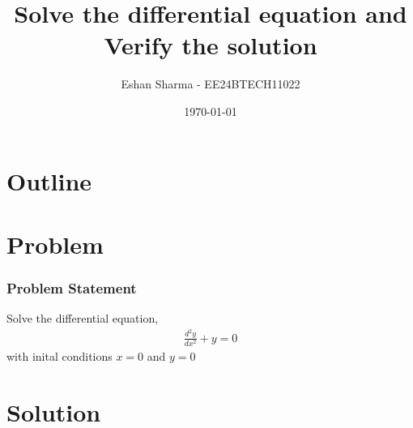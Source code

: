 \documentclass{beamer}
\title{Solve the differential equation and Verify the solution}
\author{Eshan Sharma - EE24BTECH11022}
\date{\today}
\theoremstyle{remark}
\numberwithin{equation}{section}
\begin{document}
	
	\begin{frame}
		\titlepage
	\end{frame}
	
	\section*{Outline}
	\begin{frame}
		\tableofcontents
	\end{frame}
	
	\section{Problem}
	\begin{frame}
		\frametitle{Problem Statement}
		Solve the differential equation,
		\begin{align}
			\frac{d^2y}{dx^2} + y = 0
		\end{align}
		with inital conditions $x=0$ and $y=0$
	\end{frame}
	
	\section{Solution}
	
\end{document}
